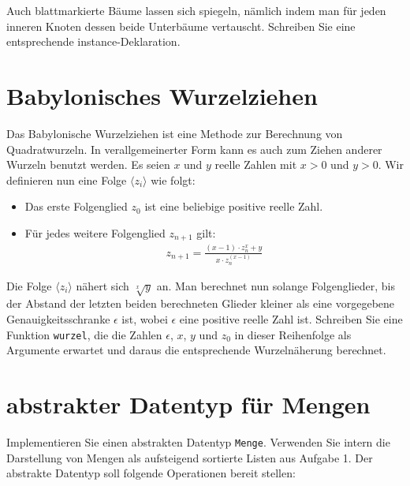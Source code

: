 \documentclass[
  10pt,                   %
  DIV12,
  german,                 %
  oneside,                %
  parskip=half,           %
  headings=normal,        %
  captions=tableheading,  %
]{scrartcl}
\begin{document}
Auch blattmarkierte Bäume lassen sich spiegeln, nämlich indem man für jeden
inneren Knoten dessen beide Unterbäume vertauscht. Schreiben Sie eine entsprechende
instance-Deklaration.

\section{Babylonisches Wurzelziehen}
Das Babylonische Wurzelziehen ist eine Methode zur Berechnung von Quadratwurzeln.
In verallgemeinerter Form kann es auch zum Ziehen anderer Wurzeln benutzt werden.
Es seien $x$ und $y$ reelle Zahlen mit $x > 0$ und $y > 0$. Wir definieren nun eine Folge $\langle z_i \rangle$
wie folgt:
\begin{itemize}
  \item Das erste Folgenglied $z_0$ ist eine beliebige positive reelle Zahl.
  \item Für jedes weitere Folgenglied $z_{n+1}$ gilt: \\
  \begin{align*}
  z_{n+1} = \frac{(x-1) \cdot z_n^x + y}{x \cdot z_n^{(x-1)}}
  \end{align*}
\end{itemize}
Die Folge $\langle z_i \rangle$ nähert sich $\sqrt[x]{y}$ an. Man berechnet nun solange Folgenglieder, bis der
Abstand der letzten beiden berechneten Glieder kleiner als eine vorgegebene Genauigkeitsschranke
$\epsilon$ ist, wobei $\epsilon$ eine positive reelle Zahl ist. Schreiben Sie eine Funktion
\lstinline|wurzel|, die die Zahlen $\epsilon$, $x$, $y$ und $z_0$ in dieser Reihenfolge als Argumente erwartet und
daraus die entsprechende Wurzelnäherung berechnet.

\section{abstrakter Datentyp für Mengen}
Implementieren Sie einen abstrakten Datentyp \lstinline|Menge|. Verwenden Sie intern die Darstellung von Mengen als aufsteigend sortierte Listen aus Aufgabe 1.
Der abstrakte Datentyp soll folgende Operationen bereit stellen:
\end{document}
